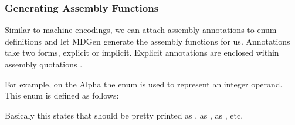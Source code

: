 \subsubsection{Generating Assembly Functions}
   Similar to machine encodings, we can attach assembly annotations to
enum definitions and let MDGen generate the assembly functions for us.  
Annotations take two forms, explicit or implicit.
Explicit annotations are enclosed within assembly quotations .

 
For example, on the Alpha the enum  is used to represent
an integer operand.  This enum is defined as follows:
Basicaly this states that  should be pretty printed 
as ,  
as ,  
as ,
etc.
 
